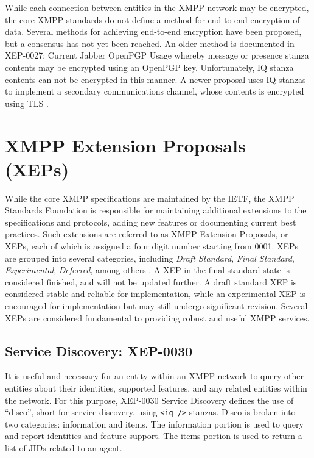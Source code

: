 While each connection between entities in the XMPP network may be encrypted,
the core XMPP standards do not define a method for end-to-end encryption of
data. Several methods for achieving end-to-end encryption have been proposed,
but a consensus has not yet been reached. An older method is documented 
in XEP-0027: Current Jabber OpenPGP Usage \cite{XEP-0027} whereby message or
presence stanza contents may be encrypted using an OpenPGP key. Unfortunately,
IQ stanza contents can not be encrypted in this manner. A newer proposal
uses IQ stanzas to implement a secondary communications channel, whose contents
is encrypted using TLS \cite{XMPP-E2E}.

\section{XMPP Extension Proposals (XEPs)}
\label{sec:XEPs}

While the core XMPP specifications are maintained by the IETF, the XMPP
Standards Foundation is responsible for maintaining additional extensions to
the specifications and protocols, adding new features or documenting current
best practices. Such extensions are referred to as XMPP Extension Proposals,
or XEPs, each of which is assigned a four digit number starting from 0001.
XEPs are grouped into several categories, including \textit{Draft Standard},
\textit{Final Standard}, \textit{Experimental}, \textit{Deferred}, among
others \cite{XEP-0001}. A XEP in the final standard state is considered
finished, and will not be updated further. A draft standard XEP is considered
stable and reliable for implementation, while an experimental XEP is encouraged
for implementation but may still undergo significant revision. Several XEPs are
considered fundamental to providing robust and useful XMPP services.

\subsection{Service Discovery: XEP-0030}
\label{sec:Service-Discovery}

It is useful and necessary for an entity within an XMPP network to query other
entities about their identities, supported features, and any related entities
within the network. For this purpose, XEP-0030 Service Discovery \cite{XEP-0030}
defines the use of ``disco'', short for service discovery, using \texttt{<iq />}
stanzas. Disco is broken into two categories: information and items. The information
portion is used to query and report identities and feature support. The items portion
is used to return a list of JIDs related to an agent.

